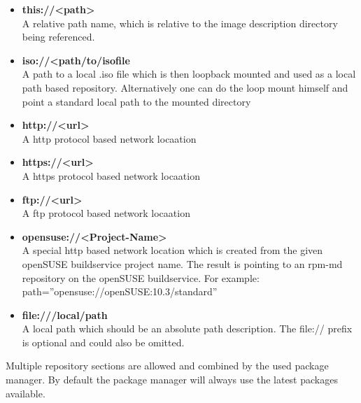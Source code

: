 \begin{itemize}
\item \textbf{this://<path>}\\
      A relative path name, which is relative to the image
      description directory being referenced.
\item \textbf{iso://<path/to/isofile}\\
      A path to a local .iso file which is then loopback mounted
      and used as a local path based repository. Alternatively one
      can do the loop mount himself and point a standard local path
      to the mounted directory
\item \textbf{http://<url>}\\
      A http protocol based network locaation
\item \textbf{https://<url>}\\
      A https protocol based network locaation
\item \textbf{ftp://<url>}\\
      A ftp protocol based network locaation
\item \textbf{opensuse://<Project-Name>}\\
      A special http based network location which is created from
      the given openSUSE buildservice project name. The result is
      pointing to an rpm-md repository on the openSUSE buildservice.
      For example:\\
      path=''opensuse://openSUSE:10.3/standard''
\item \textbf{file:///local/path}\\
      A local path which should be an absolute path description.
      The file:// prefix is optional and could also be omitted.
\end{itemize}

Multiple repository sections are allowed and combined by the
used package manager. By default the package manager will always use
the latest packages available.

